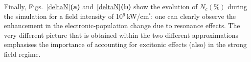 Finally, Figs.~\ref{deltaN}{\bf (a)} and~\ref{deltaN}{\bf(b)} 
show the evolution of $N_c(\%)$ during the simulation for a field
intensity of 10$^9$\,kW/cm$^²$:
one can clearly observe the enhancement in the electronic-population change
due to resonance effects. The very different picture that is obtained
within the two different approximations emphasises the importance of
accounting for excitonic effects (also) in the strong field regime. 
  


